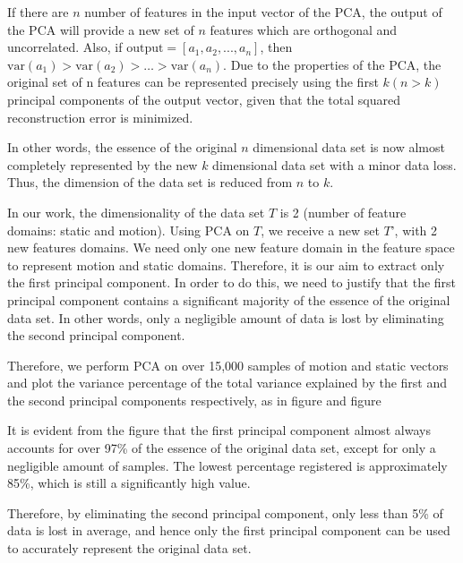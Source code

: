 If there are $n$ number of features in the input vector of the PCA, the output of the
PCA will provide a new set of $n$ features which are orthogonal and uncorrelated. Also, if
$\mathrm{output} =[a_{1}, a_{2}, ..., a_{n}]$, then $\mathrm{var}(a_{1})> \mathrm{var}(a_{2})> \dots > \mathrm{var} (a_{n})$.
Due to the properties of the PCA, the original set of n features can be
represented precisely using the first $k (n>k)$ principal
components of the output vector, given that the total squared reconstruction error
is minimized.

In other words, the essence of the original $n$ dimensional data set is now almost
completely represented by the new $k$ dimensional data set with a minor data loss. Thus, the
dimension of the data set is reduced from $n$ to $k$.


In our work, the dimensionality of the data set $T$ is 2 (number of feature domains: static
and motion).
Using PCA on $T$, we receive a new set $T$', with 2 new features domains. We need only one new feature
domain in the feature space to
represent motion and static domains. Therefore, it is our aim to extract only the first principal component.
In order to do this, we need to justify that the first principal component contains a significant majority of
the essence of the original data set. In other words, only a negligible amount of data is lost by
eliminating the second principal component.

Therefore, we perform PCA on over 15,000 samples of motion and static
vectors and plot the variance percentage of the total variance
explained by the first and the second principal components respectively, as in figure and figure


It is evident from the figure that the first principal component almost always accounts
for over 97\% of the essence of the original data set, except for only a negligible amount
of samples. The lowest percentage registered is approximately 85\%, which is still a
significantly high value.

Therefore, by eliminating the second principal component, only less than 5\% of data
is lost in average, and hence only the first principal component can be used to accurately
represent the original data set. 